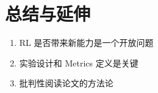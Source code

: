 \section{总结与延伸}
\begin{enumerate}
  \item RL 是否带来新能力是一个开放问题
  \item 实验设计和 Metrics 定义是关键
  \item 批判性阅读论文的方法论
\end{enumerate}

